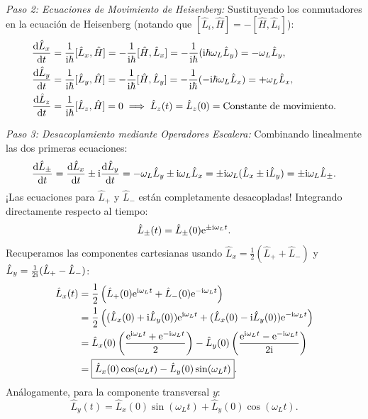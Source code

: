 \begin{ejemplobox}
    \textit{Paso 2: Ecuaciones de Movimiento de Heisenberg:}
    Sustituyendo los conmutadores en la ecuación de Heisenberg (notando que $[\hat{L}_i, \hat{H}] = -[\hat{H}, \hat{L}_i]$):
    \begin{align}
        \frac{\mathrm{d}\hat{L}_x}{\mathrm{d} t} &= \frac{1}{\mathrm{i}\hbar}[\hat{L}_x, \hat{H}] = -\frac{1}{\mathrm{i}\hbar}[\hat{H}, \hat{L}_x] = -\frac{1}{\mathrm{i}\hbar}(\mathrm{i}\hbar\omega_L\hat{L}_y) = -\omega_L\hat{L}_y, \\
        \frac{\mathrm{d}\hat{L}_y}{\mathrm{d} t} &= \frac{1}{\mathrm{i}\hbar}[\hat{L}_y, \hat{H}] = -\frac{1}{\mathrm{i}\hbar}[\hat{H}, \hat{L}_y] = -\frac{1}{\mathrm{i}\hbar}(-\mathrm{i}\hbar\omega_L\hat{L}_x) = +\omega_L\hat{L}_x, \\
        \frac{\mathrm{d}\hat{L}_z}{\mathrm{d} t} &= \frac{1}{\mathrm{i}\hbar}[\hat{L}_z, \hat{H}] = 0 \implies \hat{L}_z(t) = \hat{L}_z(0) = \text{Constante de movimiento}.
    \end{align}

    \textit{Paso 3: Desacoplamiento mediante Operadores Escalera:}
    Combinando linealmente las dos primeras ecuaciones:
    \begin{equation}
        \frac{\mathrm{d}\hat{L}_\pm}{\mathrm{d} t} = \frac{\mathrm{d}\hat{L}_x}{\mathrm{d} t} \pm \mathrm{i}\frac{\mathrm{d}\hat{L}_y}{\mathrm{d} t} = -\omega_L\hat{L}_y \pm \mathrm{i}\omega_L\hat{L}_x = \pm\mathrm{i}\omega_L(\hat{L}_x \pm \mathrm{i}\hat{L}_y) = \pm\mathrm{i}\omega_L\hat{L}_\pm.
    \end{equation}
    ¡Las ecuaciones para $\hat{L}_+$ y $\hat{L}_-$ están completamente desacopladas! Integrando directamente respecto al tiempo:
    \begin{equation}
        \hat{L}_\pm(t) = \hat{L}_\pm(0)\mathrm{e}^{\pm\mathrm{i}\omega_L t}.
    \end{equation}
    Recuperamos las componentes cartesianas usando $\hat{L}_x = \frac{1}{2}(\hat{L}_+ + \hat{L}_-)$ y $\hat{L}_y = \frac{1}{2\mathrm{i}}(\hat{L}_+ - \hat{L}_-)$:
    \begin{align}
        \hat{L}_x(t) &= \frac{1}{2}\left( \hat{L}_+(0)\mathrm{e}^{\mathrm{i}\omega_L t} + \hat{L}_-(0)\mathrm{e}^{-\mathrm{i}\omega_L t} \right) \nonumber\\
        &= \frac{1}{2}\left( (\hat{L}_x(0) + \mathrm{i}\hat{L}_y(0))\mathrm{e}^{\mathrm{i}\omega_L t} + (\hat{L}_x(0) - \mathrm{i}\hat{L}_y(0))\mathrm{e}^{-\mathrm{i}\omega_L t} \right) \nonumber\\
        &= \hat{L}_x(0)\left(\frac{\mathrm{e}^{\mathrm{i}\omega_L t} + \mathrm{e}^{-\mathrm{i}\omega_L t}}{2}\right) - \hat{L}_y(0)\left(\frac{\mathrm{e}^{\mathrm{i}\omega_L t} - \mathrm{e}^{-\mathrm{i}\omega_L t}}{2\mathrm{i}}\right) \nonumber\\
        &= \boxed{\hat{L}_x(0)\cos(\omega_L t) - \hat{L}_y(0)\sin(\omega_L t)}.
    \end{align}
    Análogamente, para la componente transversal $y$:
    \begin{equation}
        \boxed{\hat{L}_y(t) = \hat{L}_x(0)\sin(\omega_L t) + \hat{L}_y(0)\cos(\omega_L t)}.
    \end{equation}


\end{ejemplobox}
